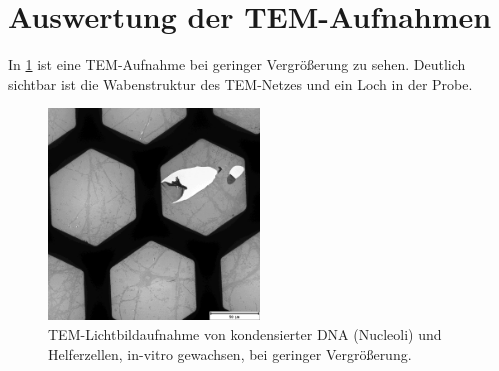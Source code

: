 \section{Auswertung der  TEM-Aufnahmen}



In \cref{fig:tem:waben} ist eine TEM-Aufnahme bei geringer Vergrößerung zu sehen.
Deutlich sichtbar ist die Wabenstruktur des TEM-Netzes und ein Loch in der Probe. %

\begin{figure}[!ht]
    \centering
    \includegraphics[width=0.5\textwidth]{img/TEM/1_low_mag_artifacts.jpg}
    \caption{TEM-Lichtbildaufnahme von kondensierter DNA (Nucleoli) und Helferzellen, in-vitro gewachsen, bei geringer Vergrößerung.}
    \label{fig:tem:waben}
\end{figure}

